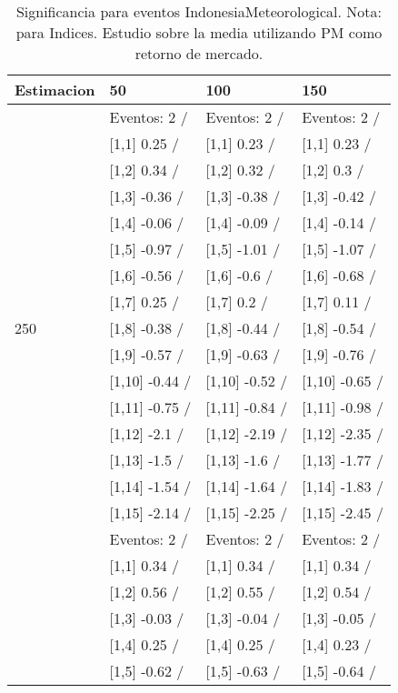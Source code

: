 \begin{table}

\caption{Significancia para eventos IndonesiaMeteorological. Nota: para Indices. Estudio sobre la media utilizando PM como retorno de mercado.}
\centering
\begin{tabular}[t]{llll}
\toprule
Estimacion & 50 & 100 & 150\\
\midrule
 & Eventos:  2 / & Eventos:  2 / & Eventos:  2 /\\
 & {}[1,1] 0.25  / & {}[1,1] 0.23  / & {}[1,1] 0.23  /\\
 & {}[1,2] 0.34  / & {}[1,2] 0.32  / & {}[1,2] 0.3  /\\
 & {}[1,3] -0.36  / & {}[1,3] -0.38  / & {}[1,3] -0.42  /\\
 & {}[1,4] -0.06  / & {}[1,4] -0.09  / & {}[1,4] -0.14  /\\
\addlinespace
 & {}[1,5] -0.97  / & {}[1,5] -1.01  / & {}[1,5] -1.07  /\\
 & {}[1,6] -0.56  / & {}[1,6] -0.6  / & {}[1,6] -0.68  /\\
 & {}[1,7] 0.25  / & {}[1,7] 0.2  / & {}[1,7] 0.11  /\\
250 & {}[1,8] -0.38  / & {}[1,8] -0.44  / & {}[1,8] -0.54  /\\
 & {}[1,9] -0.57  / & {}[1,9] -0.63  / & {}[1,9] -0.76  /\\
\addlinespace
 & {}[1,10] -0.44  / & {}[1,10] -0.52  / & {}[1,10] -0.65  /\\
 & {}[1,11] -0.75  / & {}[1,11] -0.84  / & {}[1,11] -0.98  /\\
 & {}[1,12] -2.1  / & {}[1,12] -2.19  / & {}[1,12] -2.35  /\\
 & {}[1,13] -1.5  / & {}[1,13] -1.6  / & {}[1,13] -1.77  /\\
 & {}[1,14] -1.54  / & {}[1,14] -1.64  / & {}[1,14] -1.83  /\\
\addlinespace
 & {}[1,15] -2.14  / & {}[1,15] -2.25  / & {}[1,15] -2.45  /\\
 & Eventos:  2 / & Eventos:  2 / & Eventos:  2 /\\
 & {}[1,1] 0.34  / & {}[1,1] 0.34  / & {}[1,1] 0.34  /\\
 & {}[1,2] 0.56  / & {}[1,2] 0.55  / & {}[1,2] 0.54  /\\
 & {}[1,3] -0.03  / & {}[1,3] -0.04  / & {}[1,3] -0.05  /\\
\addlinespace
 & {}[1,4] 0.25  / & {}[1,4] 0.25  / & {}[1,4] 0.23  /\\
 & {}[1,5] -0.62  / & {}[1,5] -0.63  / & {}[1,5] -0.64  /\\

\end{tabular}
\end{table}
